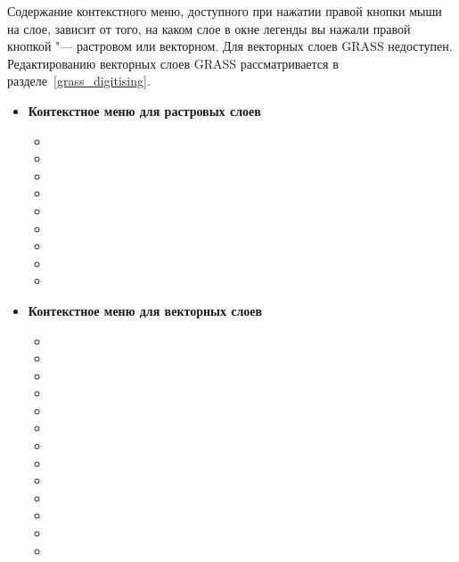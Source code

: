 Содержание контекстного меню, доступного при нажатии правой кнопки мыши
на слое, зависит от того, на каком слое в окне легенды вы нажали правой
кнопкой "--- растровом или векторном. Для векторных слоев GRASS
 недоступен. Редактированию векторных
слоев GRASS рассматривается в разделе~\ref{grass_digitising}.

\begin{itemize}

\item \textbf{Контекстное меню для растровых слоев}
\begin{itemize}
\item {}
\item {}
\item {}
\item {}
\item {}
\item {}
\item {}
\item {}
\item {}
\end{itemize}

\item \textbf{Контекстное меню для векторных слоев}
\begin{itemize}
\item {}
\item {}
\item {}
\item {}
\item {}
\item {}
\item {}
\item {}
\item {}
\item {}
\item {}
\item {}
\item {}
\end{itemize}


\end{itemize}
